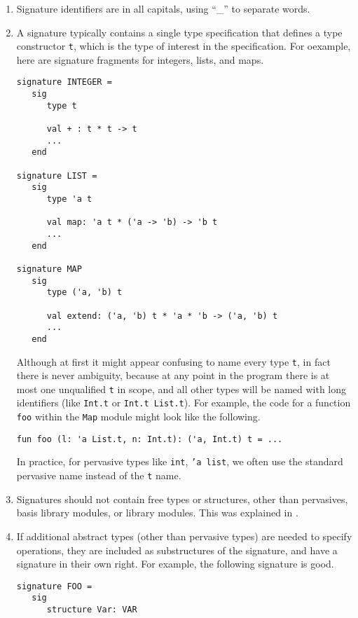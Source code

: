\documentclass[12pt]{article}
\begin{document}
\begin{enumerate}

\item
Signature identifiers are in all capitals, using ``\_'' to
separate words.

\item
A signature typically contains a single type specification that defines a type
constructor {\tt t}, which is the type of interest in the specification.  For
oexample, here are signature fragments for integers, lists, and maps.
\begin{verbatim}
signature INTEGER =
   sig
      type t

      val + : t * t -> t
      ...
   end

signature LIST =
   sig
      type 'a t

      val map: 'a t * ('a -> 'b) -> 'b t
      ...
   end

signature MAP
   sig
      type ('a, 'b) t

      val extend: ('a, 'b) t * 'a * 'b -> ('a, 'b) t
      ...
   end
\end{verbatim}
Although at first it might appear confusing to name every type {\tt t}, in fact
there is never ambiguity, because at any point in the program there is at most
one unqualified {\tt t} in scope, and all other types will be named with long
identifiers (like {\tt Int.t} or {\tt Int.t List.t}).  For example, the code for
a function {\tt foo} within the {\tt Map} module might look like the following.
\begin{verbatim}
fun foo (l: 'a List.t, n: Int.t): ('a, Int.t) t = ...
\end{verbatim}

In practice, for pervasive types like {\tt int}, {\tt 'a list}, we often use the
standard pervasive name instead of the {\tt t} name.

\item Signatures should not contain free types or structures, other than
pervasives, basis library modules, or {\mlton} library modules.  This was
explained in .

\item
If additional abstract types (other than pervasive types) are needed to specify
operations, they are included as substructures of the signature, and have a
signature in their own right. For example, the following signature is good.

\begin{verbatim}
signature FOO =
   sig
      structure Var: VAR


\end{verbatim}
\end{enumerate}
\end{document}
